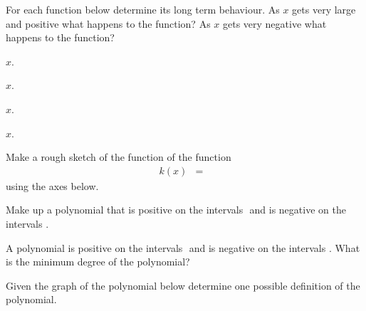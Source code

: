 \begin{problem}
\item For each function below determine its long term behaviour. As
  $x$ gets very large and positive what happens to the function? As
  $x$ gets very negative what happens to the function?
  \begin{subproblem}
  \item ${\displaystyle x }$.
    \vfill
  \item ${\displaystyle x }$.
    \vfill
  \item ${\displaystyle x }$.
    \vfill
  \item ${\displaystyle x }$.
    \vfill
  \end{subproblem}

  \clearpage

\item Make a rough sketch of the function of the function
  \begin{eqnarray*}
    k(x) & = & 
  \end{eqnarray*}
  using the axes below.


  \vfill

  \clearpage
  
  \item Make up a polynomial that is positive on the intervals $ $ and
    is negative on the intervals $ $.

    \vfill

  \item A polynomial is positive on the intervals
    $ $ and is negative on the intervals $ $. What is the minimum degree
    of the polynomial?

    \vfill

    \clearpage
    
  \item  Given the graph of the polynomial below determine one
    possible definition of the polynomial.
    
    \vfill


\end{problem}


